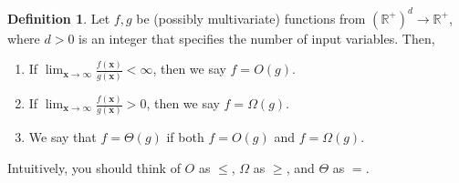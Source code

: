 \documentclass[10pt]{article}
\theoremstyle{definition}
\newtheorem{defn}{Definition}
\newcommand{\R}{\mathbb R}
\newcommand{\x}{\mathbf x}
\begin{document}
\begin{defn}
    Let $f,g$ be (possibly multivariate) functions from $(\R^+)^d\to\R^+$,
    where $d>0$ is an integer that specifies the number of input variables.
    Then,
    \begin{enumerate}
        \item If $\displaystyle\lim_{\x\to\infty} \frac{f(\x)}{g(\x)} < \infty$, then we say $f = O(g)$.
        \item If $\displaystyle\lim_{\x\to\infty} \frac{f(\x)}{g(\x)} > 0$, then we say $f = \Omega(g)$.
        \item We say that $f = \Theta(g)$ if both $f=O(g)$ and $f=\Omega(g)$.
    \end{enumerate}
    Intuitively, you should think of $O$ as $\le$, $\Omega$ as $\ge$, and $\Theta$ as $=$.
\end{defn}
\end{document}
